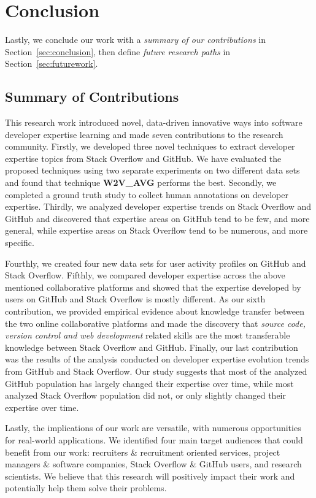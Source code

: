 \chapter{Conclusion\label{chap:conclusion}}

   Lastly, we conclude our work with a \emph{summary of our contributions} in Section~\ref{sec:conclusion}, then define \emph{future research paths} in Section~\ref{sec:futurework}.
        
    \section{Summary of Contributions\label{sec:conclusion}}
        
        This research work introduced novel, data-driven innovative ways into software developer expertise learning and made seven contributions to the research community. Firstly, we developed three novel techniques to extract developer expertise topics from Stack Overflow and GitHub. We have evaluated the proposed techniques using two separate experiments on two different data sets and found that technique \textbf{W2V\_AVG} performs the best. Secondly, we completed a ground truth study to collect human annotations on developer expertise. Thirdly, we analyzed developer expertise trends on Stack Overflow and GitHub and discovered that expertise areas on GitHub tend to be few, and more general, while expertise areas on Stack Overflow tend to be numerous, and more specific.
        
        Fourthly, we created four new data sets for user activity profiles on GitHub and Stack Overflow. Fifthly, we compared developer expertise across the above mentioned collaborative platforms and showed that the expertise developed by users on GitHub and Stack Overflow is mostly different. As our sixth contribution, we provided empirical evidence about knowledge transfer between the two online collaborative platforms and made the discovery that \emph{source code, version control and web development} related skills are the most transferable knowledge between Stack Overflow and GitHub. Finally, our last contribution was the results of the analysis conducted on developer expertise evolution trends from GitHub and Stack Overflow. Our study suggests that most of the analyzed GitHub population has largely changed their expertise over time, while most analyzed Stack Overflow population did not, or only slightly changed their expertise over time.
        
        Lastly, the implications of our work are versatile, with numerous opportunities for real-world applications. We identified four main target audiences that could benefit from our work: recruiters \& recruitment oriented services, project managers \& software companies, Stack Overflow \& GitHub users, and research scientists. We believe that this research will positively impact their work and potentially help them solve their problems. 
        
